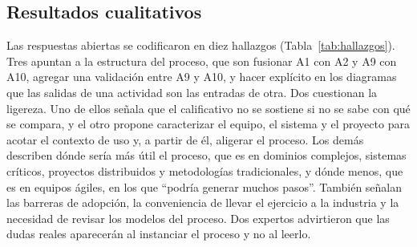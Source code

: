 \documentclass[12pt,letterpaper,oneside]{report}
\begin{document}
\subsection{Resultados cualitativos}
Las respuestas abiertas se codificaron en diez hallazgos
(Tabla~\ref{tab:hallazgos}). Tres apuntan a la estructura del proceso, que son
fusionar A1 con A2 y A9 con A10, agregar una validación entre A9 y A10, y hacer explícito
en los diagramas que las salidas de una actividad son las entradas de otra. Dos
cuestionan la ligereza. Uno de ellos señala que el calificativo no se sostiene
si no se sabe con qué se compara, y el otro propone caracterizar el equipo, el
sistema y el proyecto para acotar el contexto de uso y, a partir de él,
aligerar el proceso. Los demás describen dónde sería más útil el proceso, que es en dominios
complejos, sistemas críticos, proyectos distribuidos y metodologías
tradicionales, y dónde menos, que es en equipos ágiles, en los que ``podría
generar muchos pasos''. También señalan las barreras de adopción, la
conveniencia de llevar el ejercicio a la industria y la necesidad de revisar los
modelos del proceso. Dos
expertos advirtieron que las dudas reales aparecerán al instanciar el proceso y
no al leerlo.
\end{document}
